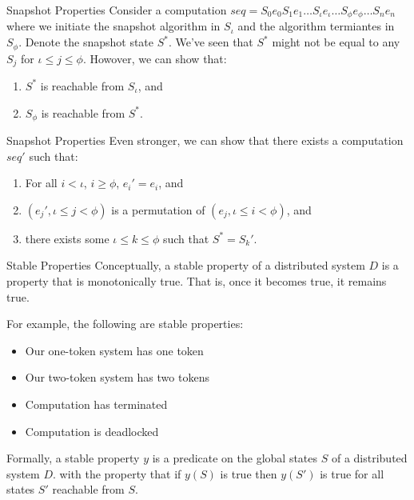 \begin{frame}{Snapshot Properties}
  Consider a computation $seq = S_0 e_0 S_1 e_1 \ldots S_\iota e_\iota \ldots
  S_\phi e_\phi \ldots S_n e_n$ where we initiate the snapshot algorithm in
  $S_\iota$ and the algorithm termiantes in $S_\phi$. Denote the snapshot state
  $S^*$.  We've seen that $S^*$ might not be equal to any $S_j$ for $\iota \leq
  j \leq \phi$. Howover, we can show that:
  \begin{enumerate}
    \item $S^*$ is reachable from $S_\iota$, and
    \item $S_\phi$ is reachable from $S^*$.
  \end{enumerate}
\end{frame}

\begin{frame}{Snapshot Properties}
  Even stronger, we can show that there exists a computation $seq'$ such that:
  \begin{enumerate}
    \item For all $i < \iota$, $i \geq \phi$, $e_i' = e_i$, and
    \item $(e_j', \iota \leq j < \phi)$ is a permutation of $(e_j, \iota \leq i
      < \phi)$, and
    \item there exists some $\iota \leq k \leq \phi$ such that $S^* = S_k'$.
  \end{enumerate}
\end{frame}

\begin{frame}{Stable Properties}
  Conceptually, a stable property of a distributed system $D$ is a property
  that is monotonically true. That is, once it becomes true, it remains true.

  \pause

  For example, the following are stable properties:
  \begin{itemize}
    \item Our one-token system has one token
    \item Our two-token system has two tokens
    \item Computation has terminated
    \item Computation is deadlocked
  \end{itemize}

  \pause

  Formally, a stable property $y$ is a predicate on the global states $S$ of a
  distributed system $D$. with the property that if $y(S)$ is true then $y(S')$
  is true for all states $S'$ reachable from $S$.
\end{frame}

